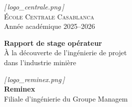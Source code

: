 \documentclass[12pt,a4paper,oneside]{report}
\begin{document}
\begin{titlepage}
\thispagestyle{empty}
\centering

{\color{softgray}\itshape\footnotesize[\,logo\_centrale.png\,]}\\[2mm]

\vspace{0.4cm}
{\large\scshape École Centrale Casablanca}\\[0.2cm]
{\color{softgray}Année académique 2025--2026}\\[1.2cm]


\vspace{1.0cm}
{\Huge\bfseries\color{darkslate} Rapport de stage opérateur}\\[0.5cm]
{\large\color{centralegreen} À la découverte de l'ingénierie de projet\\ dans l'industrie minière}\\[0.4cm]

\vspace{0.6cm}

\vspace{1.2cm}

{\color{softgray}\itshape\footnotesize[\,logo\_reminex.png\,]}\\[2mm]
{\large\bfseries Reminex}\\
{\normalsize Filiale d'ingénierie du Groupe Managem}\\[1.4cm]


\end{titlepage}
\end{document}
